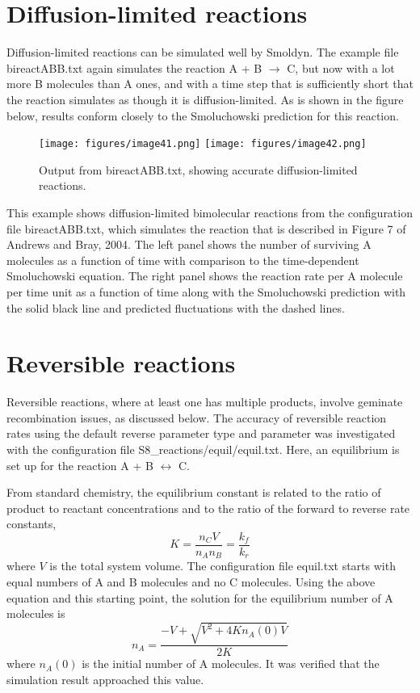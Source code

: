 \documentclass {scrbook}
\begin{document}
\section{Diffusion-limited reactions}

Diffusion-limited reactions can be simulated well by Smoldyn. The example file bireactABB.txt again simulates the reaction A + B $\rightarrow$ C, but now with a lot more B molecules than A ones, and with a time step that is sufficiently short that the reaction simulates as though it is diffusion-limited. As is shown in the figure below, results conform closely to the Smoluchowski prediction for this reaction.

\begin{figure}[h]
\centering
\texttt{[image: figures/image41.png]}
\texttt{[image: figures/image42.png]}
\caption{Output from bireactABB.txt, showing accurate diffusion-limited reactions.}
\label{fig:bireactABB}
\end{figure}

This example shows diffusion-limited bimolecular reactions from the configuration file bireactABB.txt, which simulates the reaction that is described in Figure 7 of Andrews and Bray, 2004. The left panel shows the number of surviving A molecules as a function of time with comparison to the time-dependent Smoluchowski equation. The right panel shows the reaction rate per A molecule per time unit as a function of time along with the Smoluchowski prediction with the solid black line and predicted fluctuations with the dashed lines.

\section{Reversible reactions}

Reversible reactions, where at least one has multiple products, involve geminate recombination issues, as discussed below. The accuracy of reversible reaction rates using the default reverse parameter type and parameter was investigated with the configuration file S8\_reactions/equil/equil.txt. Here, an equilibrium is set up for the reaction A + B $\leftrightarrow$ C.

From standard chemistry, the equilibrium constant is related to the ratio of product to reactant concentrations and to the ratio of the forward to reverse rate constants,
$$K=\frac{n_C V}{n_A n_B} = \frac{k_f}{k_r}$$
where $V$ is the total system volume. The configuration file equil.txt starts with equal numbers of A and B molecules and no C molecules. Using the above equation and this starting point, the solution for the equilibrium number of A molecules is
$$n_A = \frac{-V + \sqrt{V^2+4Kn_A(0) V}}{2K}$$
where $n_A(0)$ is the initial number of A molecules. It was verified that the simulation result approached this value.
\end{document}
